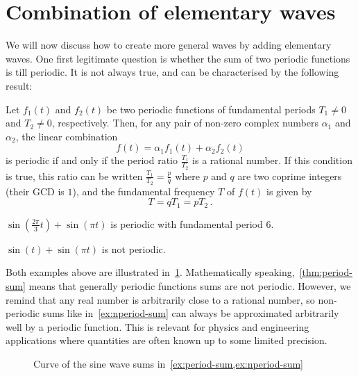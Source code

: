 \section{Combination of elementary waves}
We will now discuss how to create more general waves by adding elementary waves. One first
legitimate question is whether the sum of two periodic functions is till periodic. It is
not always true, and can be characterised by the following result:
\begin{theorem}
  \label{thm:period-sum}
  Let $f_1(t)$ and $f_2(t)$ be two periodic functions of fundamental periods $T_1\neq 0$ and
  $T_2\neq 0$, respectively. Then, for any pair of non-zero complex numbers $\alpha_1$ and $\alpha_2$, the linear combination
  \begin{equation}
    f(t)=\alpha_1 f_1(t)+\alpha_2 f_2(t)
  \end{equation}
  is periodic if and only if the period ratio  $\frac{T_1}{T_2}$ is
  a rational number. If this condition is true, this ratio can be written
  $\frac{T_1}{T_2}=\frac{p}{q}$ where $p$ and $q$ are two coprime integers (\ie their GCD
  is $1$), and the fundamental frequency $T$ of $f(t)$ is given by
  \begin{equation}
    T=qT_1=pT_2\,.
  \end{equation}
\end{theorem}
\begin{example}
  \label{ex:period-sum}
  $\sin\left(\frac{2\pi}{3}t\right)+\sin(\pi t)$ is periodic with fundamental period $6$.
\end{example}
\begin{example}
  \label{ex:nperiod-sum}
  $\sin(t)+\sin(\pi t)$ is not periodic.
\end{example}
\noindent Both examples above are illustrated in~\cref{fig:sine-sum}. Mathematically
speaking,~\cref{thm:period-sum} means that generally periodic functions sums are not
periodic. However, we remind that any real number is arbitrarily close to a rational
number, so non-periodic sums like in~\cref{ex:nperiod-sum} can always be approximated
arbitrarily well by a periodic function. This is relevant for physics and engineering
applications where quantities are often known up to some limited precision.
\begin{figure}
  \caption{Curve of the sine wave sums in~\cref{ex:period-sum,ex:nperiod-sum}}
  \label{fig:sine-sum}
\end{figure}

